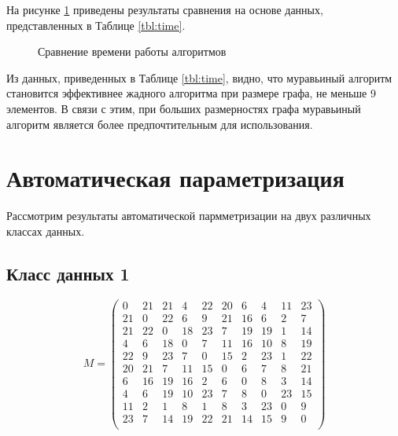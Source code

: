 На рисунке \ref{plt:time} приведены результаты сравнения на основе данных, представленных в Таблице \ref{tbl:time}.

\begin{figure}[ht]
	\centering
	\captionsetup{justification=centering}
	\caption{Сравнение времени работы алгоритмов}
	\label{plt:time}
\end{figure}

Из данных, приведенных в  Таблице \ref{tbl:time}, видно, что муравьиный алгоритм становится эффективнее жадного алгоритма при размере графа, не меньше 9 элементов. В связи с этим, при больших размерностях графа муравьиный алгоритм является более предпочтительным для использования.

\section{Автоматическая параметризация}

Рассмотрим результаты автоматической пармметризации на двух различных классах данных.

\subsection{Класс данных 1}
\begin{equation}
    \label{matrix}
    M = \begin{pmatrix}
        0 &    21 &    21 &     4 &    22 &    20 &     6 &     4 &    11 &    23 \\
        21 &    0 &    22 &     6 &     9 &    21 &    16 &     6 &     2 &     7 \\
        21 &   22 &     0 &    18 &    23 &     7 &    19 &    19 &     1 &    14 \\
        4 &     6 &    18 &     0 &     7 &    11 &    16 &    10 &     8 &    19 \\
        22 &    9 &    23 &     7 &     0 &    15 &     2 &    23 &     1 &    22 \\
        20 &   21 &     7 &    11 &    15 &     0 &     6 &     7 &     8 &    21 \\
        6 &    16 &    19 &    16 &     2 &     6 &     0 &     8 &     3 &    14 \\
        4 &     6 &    19 &    10 &    23 &     7 &     8 &     0 &    23 &    15 \\
        11 &    2 &     1 &     8 &     1 &     8 &     3 &    23 &     0 &     9 \\
        23 &    7 &    14 &    19 &    22 &    21 &    14 &    15 &     9 &     0 \\
    \end{pmatrix}
\end{equation}

